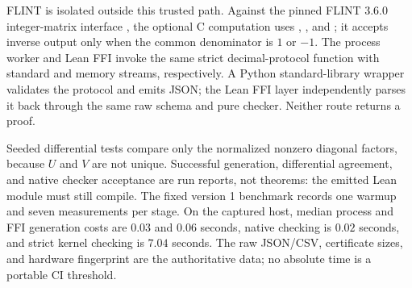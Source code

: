 FLINT is isolated outside this trusted path. Against the pinned FLINT 3.6.0
integer-matrix interface \citep{flint360fmpzmat}, the optional C computation uses
, , and
; it accepts inverse output only when the common
denominator is \(1\) or \(-1\). The process worker and Lean FFI invoke the same
strict decimal-protocol function with standard and memory streams,
respectively. A Python standard-library wrapper validates the protocol and
emits JSON; the Lean FFI layer independently parses it back through the same
raw schema and pure checker. Neither route returns a proof.

Seeded differential tests compare only the normalized nonzero diagonal
factors, because \(U\) and \(V\) are not unique. Successful generation,
differential agreement, and native checker acceptance are run reports, not
theorems: the emitted Lean module must still compile. The fixed version 1
benchmark records one warmup and seven measurements per stage. On the captured
host, median process and FFI generation costs are \(0.03\) and \(0.06\) seconds,
native checking is \(0.02\) seconds, and strict kernel checking is \(7.04\)
seconds. The raw JSON/CSV, certificate sizes, and hardware fingerprint are the
authoritative data; no absolute time is a portable CI threshold.
